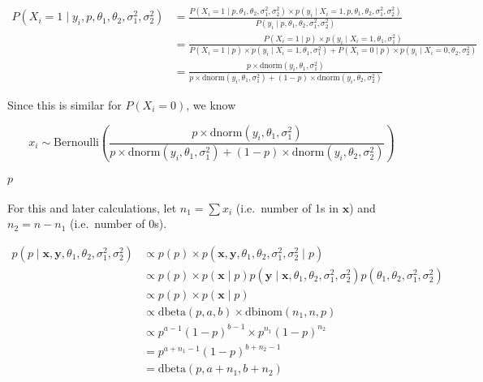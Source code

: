 \documentclass[]{article}
\let\oldparagraph\paragraph
\renewcommand{\paragraph}[1]{\oldparagraph{#1}\mbox{}}
\begin{document}
\[
\begin{align}
P(X_i = 1 \mid y_i, p, \theta_1, \theta_2, \sigma^2_1, \sigma^2_2) &= \frac{P(X_i = 1 \mid p, \theta_1, \theta_2, \sigma^2_1, \sigma^2_2) \times p(y_i \mid X_i = 1, p, \theta_1, \theta_2, \sigma^2_1, \sigma^2_2)}{P(y_i \mid p, \theta_1, \theta_2, \sigma^2_1, \sigma^2_2)} \\
&=
\frac{P(X_i = 1 \mid p) \times p(y_i \mid X_i = 1, \theta_1, \sigma^2_1)}{P(X_i = 1 \mid p) \times p(y_i \mid X_i = 1, \theta_1, \sigma^2_1) + P(X_i = 0 \mid p) \times p(y_i \mid X_i = 0, \theta_2, \sigma^2_2)} \\
&= \frac{p \times \text{dnorm}(y_i, \theta_1, \sigma^2_1)}{p \times \text{dnorm}(y_i, \theta_1, \sigma^2_1) + (1 - p) \times \text{dnorm}(y_i, \theta_2, \sigma^2_2)}
\end{align}
\]

Since this is similar for \(P(X_i = 0)\), we know

\[
x_i \sim \text{Bernoulli}\left(\frac{p \times \text{dnorm}(y_i, \theta_1, \sigma^2_1)}{p \times \text{dnorm}(y_i, \theta_1, \sigma^2_1) + (1 - p) \times \text{dnorm}(y_i, \theta_2, \sigma^2_2)}\right)
\]

\hypertarget{p}{%
\paragraph{\texorpdfstring{\(p\)}{p}}\label{p}}

For this and later calculations, let \(n_1 = \sum x_i\) (i.e.~number of
1s in \(\boldsymbol{x}\)) and \(n_2 = n - n_1\) (i.e.~number of 0s).

\[
\begin{align}
p(p \mid \boldsymbol{x}, \boldsymbol{y}, \theta_1, \theta_2, \sigma^2_1, \sigma^2_2) &\propto p(p) \times p(\boldsymbol{x}, \boldsymbol{y}, \theta_1, \theta_2, \sigma^2_1, \sigma^2_2 \mid p) \\
&\propto p(p) \times p(\boldsymbol{x} \mid p) p(\boldsymbol{y} \mid \boldsymbol{x}, \theta_1, \theta_2, \sigma^2_1, \sigma^2_2) p(\theta_1, \theta_2, \sigma^2_1, \sigma^2_2) \\
&\propto p(p) \times p(\boldsymbol{x} \mid p) \\
&\propto \text{dbeta}(p, a, b) \times \text{dbinom}(n_1, n, p) \\
&\propto p^{a - 1} (1 - p)^{b - 1} \times p^{n_1} (1 - p)^{n_2} \\
&= p^{a + n_1 - 1}(1 - p)^{b + n_2 - 1} \\
&= \text{dbeta}(p, a + n_1, b + n_2)
\end{align}
\]
\end{document}
